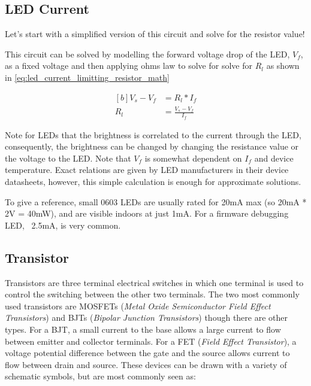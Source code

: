 \documentclass[main.tex]{subfiles}
\begin{document}
\subsection{LED Current}
Let's start with a simplified version of this circuit and solve for  the resistor value! 


This circuit can be solved by modelling the forward voltage drop of the LED, $V_f$, as a fixed voltage and then applying ohms law to solve for solve for $R_l$ as shown in \eqref{eq:led_current_limitting_resistor_math}

\begin{equation}
    \begin{aligned}[b]
        V_s - V_f &= R_l * I _f \\
        R_l &= \frac{V_s - V_f}{I_f}
    \end{aligned}
    \label{eq:led_current_limitting_resistor_math}
\end{equation}

Note for LEDs that the brightness is correlated to the current through the LED, consequently, the brightness can be changed by changing the resistance value or the voltage to the LED. Note that $V_f$ is somewhat dependent on $I_f$ and device temperature. Exact relations are given by LED manufacturers in their device datasheets, however, this simple calculation is enough for approximate solutions. 

To give a reference, small 0603 LEDs are usually rated for 20mA max (so 20mA * 2V = 40mW), and are visible indoors at just 1mA. For a firmware debugging LED, ~2.5mA, is very common. 

\subsection{Transistor}
Transistors are three terminal electrical switches in which one terminal is used to control the switching between the other two terminals. The two most commonly used transistors are MOSFETs (\textit{Metal Oxide Semiconductor Field Effect Transistors}) and BJTs (\textit{Bipolar Junction Transistors}) though there are other types. For a BJT, a small current to the base allows a large current to flow between emitter and collector terminals. For a FET (\textit{Field Effect Transistor}), a voltage potential difference between the gate and the source allows current to flow between drain and source. These devices can be drawn with a variety of schematic symbols, but are most commonly seen as:
\end{document}
